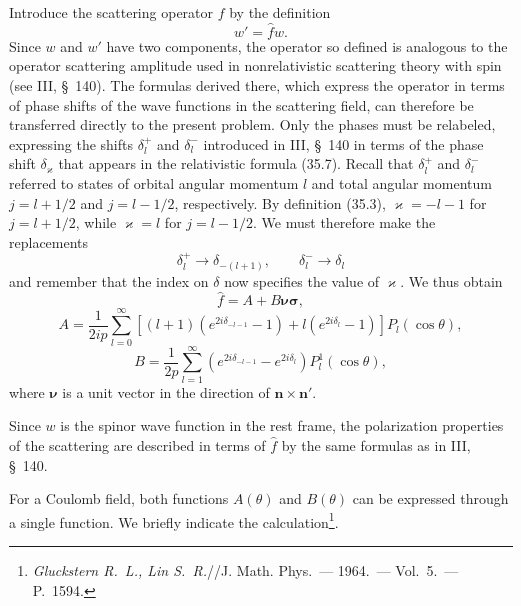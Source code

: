 Introduce the scattering operator $f$ by the definition
\begin{equation}
w'=\widehat f w.
\tag{37.2}
\end{equation}
Since $w$ and $w'$ have two components, the operator so defined is analogous to the operator scattering amplitude used in nonrelativistic scattering theory with spin (see III, \S~140). The formulas derived there, which express the operator in terms of phase shifts of the wave functions in the scattering field, can therefore be transferred directly to the present problem. Only the phases must be relabeled, expressing the shifts $\delta_l^+$ and $\delta_l^-$ introduced in III, \S~140 in terms of the phase shift $\delta_\varkappa$ that appears in the relativistic formula (35.7). Recall that $\delta_l^+$ and $\delta_l^-$ referred to states of orbital angular momentum $l$ and total angular momentum $j=l+1/2$ and $j=l-1/2$, respectively. By definition (35.3), $\varkappa=-l-1$ for $j=l+1/2$, while $\varkappa=l$ for $j=l-1/2$. We must therefore make the replacements
\[
\delta_l^+\to\delta_{-(l+1)},\qquad \delta_l^-\to\delta_l
\]
and remember that the index on $\delta$ now specifies the value of $\varkappa$. We thus obtain
\begin{equation}
\widehat f=A+B\boldsymbol\nu\boldsymbol\sigma,
\tag{37.3}
\end{equation}
\begin{equation}
A=\frac1{2ip}\sum_{l=0}^{\infty}
\left[(l+1)(e^{2i\delta_{-l-1}}-1)+l(e^{2i\delta_l}-1)\right]P_l(\cos\theta),
\tag{37.4}
\end{equation}
\begin{equation}
B=\frac1{2p}\sum_{l=1}^{\infty}
(e^{2i\delta_{-l-1}}-e^{2i\delta_l})P_l^1(\cos\theta),
\tag{37.5}
\end{equation}
where $\boldsymbol\nu$ is a unit vector in the direction of $\mathbf n\times\mathbf n'$.

Since $w$ is the spinor wave function in the rest frame, the polarization properties of the scattering are described in terms of $\widehat f$ by the same formulas as in III, \S~140.

For a Coulomb field, both functions $A(\theta)$ and $B(\theta)$ can be expressed through a single function. We briefly indicate the calculation\footnote{\emph{Gluckstern R.~L., Lin S.~R.}//J. Math. Phys.~--- 1964.~--- Vol.~5.~--- P.~1594.}.

